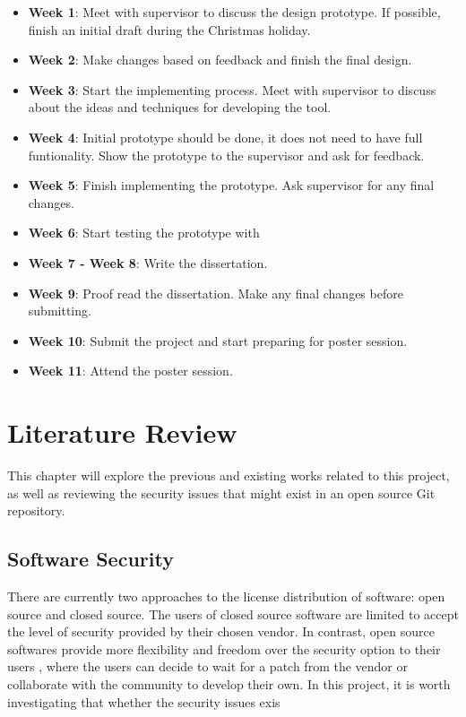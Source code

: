 \documentclass[12pt, a4paper]{report}
\begin{document}
\begin{itemize}
	\item \textbf{Week 1}: Meet with supervisor to discuss the design prototype. If possible, finish
	an initial draft during the Christmas holiday.
	\item \textbf{Week 2}: Make changes based on feedback and finish the final design.
	\item \textbf{Week 3}: Start the implementing process. Meet with supervisor to discuss about the
	ideas and techniques for developing the tool.
	\item \textbf{Week 4}: Initial prototype should be done, it does not need to have full
	funtionality. Show the prototype to the supervisor and ask for feedback.
	\item \textbf{Week 5}: Finish implementing the prototype. Ask supervisor for any final changes.
	\item \textbf{Week 6}: Start testing the prototype with
	\item \textbf{Week 7 - Week 8}: Write the dissertation.
	\item \textbf{Week 9}: Proof read the dissertation. Make any final changes before submitting.
	\item \textbf{Week 10}: Submit the project and start preparing for poster session.
	\item \textbf{Week 11}: Attend the poster session.
\end{itemize}


\chapter{Literature Review}
This chapter will explore the previous and existing works related to this project, as well as
reviewing the security issues that might exist in an open source Git repository.

\section{Software Security}
There are currently two approaches to the license distribution of software: open source and closed
source. The users of closed source software are limited to accept the level of security
provided by their chosen vendor. In contrast, open source softwares provide more flexibility and
freedom over the security option to their users \cite{payne_2002}, where the users can decide to
wait for a patch from the vendor or collaborate with the community to develop their own. In this
project, it is worth investigating that whether the security issues exis
\end{document}
